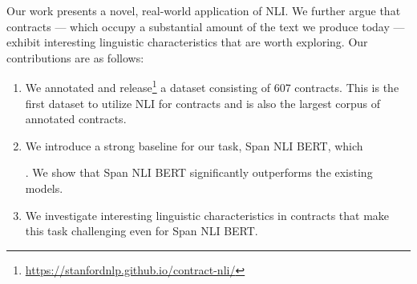 Our work presents a novel, real-world application of NLI.
We further argue that contracts --- which occupy a substantial amount of the text we produce today --- exhibit interesting linguistic characteristics that are worth exploring.
Our contributions are as follows:
\begin{enumerate}
    \item We annotated and release\footnote{\url{https://stanfordnlp.github.io/contract-nli/}} a dataset consisting of 607 contracts. This is the first dataset to utilize NLI for contracts and is also the largest corpus of annotated contracts.
    \item We introduce a strong baseline for our task, Span NLI BERT, which . We show that Span NLI BERT significantly outperforms the existing models.
    \item We investigate interesting linguistic characteristics in contracts that make this task challenging even for Span NLI BERT.
\end{enumerate}
